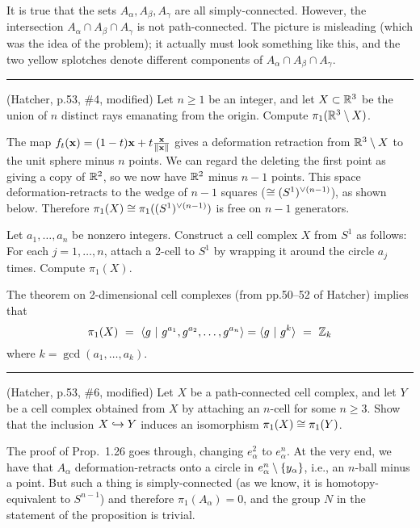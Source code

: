 \soln It is true that the sets $A_\alpha,A_\beta,A_\gamma$ are all simply-connected.
However, the intersection $A_\alpha\cap A_\beta\cap A_\gamma$ is not path-connected.
The picture is misleading (which was the idea of the problem); it actually must look something like this,
and the two yellow splotches denote different components of $A_\alpha\cap A_\beta\cap A_\gamma$.


\vfill\hrule\vfill

\prob (Hatcher, p.53, \#4, modified) Let $n\geq 1$ be an integer, and 
let $X\subset\mathbb{R}^3$ be the union of $n$ distinct rays emanating from the 
origin.  Compute $\pi_1(\mathbb{R}^3\setminus X)$.

\soln The map $f_t(\mathbf{x})=(1-t)\mathbf{x}+t\frac{\mathbf{x}}{\|\mathbf{x}\|}$ gives a deformation retraction from
$\mathbb{R}^3\setminus X$ to the unit sphere minus $n$ points.  We can regard the
deleting the first point as giving a copy of $\mathbb{R}^2$, so we now have $\mathbb{R}^2$ minus $n-1$ points.
This space deformation-retracts to the wedge of $n-1$ squares ($\cong (S^1)^{\vee(n-1)}$), as shown below.
Therefore $\pi_1(X)\cong\pi_1((S^1)^{\vee(n-1)})$
is free on $n-1$ generators.


\prob Let $a_1,\dots,a_n$ be nonzero integers.  
Construct a cell complex $X$ from $S^1$ as follows:
For each $j=1,\dots,n$, attach a $2$-cell to $S^1$ by wrapping
it around the circle $a_j$ times.  Compute $\pi_1(X)$.

\soln The theorem on 2-dimensional cell complexes
(from pp.50--52 of Hatcher) implies that
\[\pi_1(X) ~=~ \langle g ~|~ g^{a_1},g^{a_2},\dots,g^{a_n}\rangle = \langle g ~|~ g^k\rangle ~=~ \mathbb{Z}_k\]
where $k=\gcd(a_1,\dots,a_k)$.

\vfill\hrule\vfill

\prob (Hatcher, p.53, \#6, modified) Let $X$ be a path-connected cell 
complex, and let $Y$ be a cell complex obtained from $X$ by attaching an 
$n$-cell for some $n\geq 3$.  Show that the inclusion $X\hookrightarrow Y$ induces 
an isomorphism $\pi_1(X)\cong\pi_1(Y)$.

\soln The proof of Prop.~1.26 goes through, changing $e_\alpha^2$ to
$e_\alpha^n$.  At the very end, we have that $A_\alpha$
deformation-retracts onto a circle in $e^n_\alpha\setminus\{y_\alpha\}$,
i.e., an $n$-ball minus a point.  But such a thing is simply-connected
(as we know, it is homotopy-equivalent to $S^{n-1}$) and therefore
$\pi_1(A_\alpha)=0$, and the group $N$ in the statement of the proposition
is trivial.

